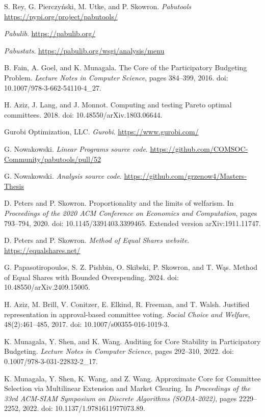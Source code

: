 \documentclass[magisterska,en]{pracamgr}
\begin{document}
\begin{thebibliography}{99}

 S. Rey, G. Pierczyński, M. Utke, and P. Skowron. \textit{Pabutools}
\url{https://pypi.org/project/pabutools/}

 \textit{Pabulib}.
\url{https://pabulib.org/}

 \textit{Pabustats}.
\url{https://pabulib.org/wsgi/analysis/menu}

 B. Fain, A. Goel, and K. Munagala. The Core of the Participatory Budgeting Problem.
\textit{Lecture Notes in Computer Science}, pages 384--399, 2016.
doi: 10.1007/978-3-662-54110-4\_27.

 H. Aziz, J. Lang, and J. Monnot. Computing and testing Pareto optimal committees.
2018.
doi: 10.48550/arXiv.1803.06644.

 Gurobi Optimization, LLC. \textit{Gurobi}.
\url{https://www.gurobi.com/}

 G. Nowakowski. \textit{Linear Programs source code}.
\url{https://github.com/COMSOC-Community/pabutools/pull/52}

 G. Nowakowski. \textit{Analysis source code}.
\url{https://github.com/grzenow4/Masters-Thesis}

 D. Peters and P. Skowron. Proportionality and the limits of welfarism.
In \textit{Proceedings of the 2020 ACM Conference on Economics and Computation}, pages 793--794, 2020.
doi: 10.1145/3391403.3399465. Extended version arXiv:1911.11747.

 D. Peters and P. Skowron. \textit{Method of Equal Shares website}.
\url{https://equalshares.net/}

 G. Papasotiropoulos, S. Z. Pishbin, O. Skibski, P. Skowron, and T. Wąs. Method of Equal Shares with Bounded Overspending.
2024.
doi: 10.48550/arXiv.2409.15005.

 H. Aziz, M. Brill, V. Conitzer, E. Elkind, R. Freeman, and T. Walsh. Justified representation in approval-based committee voting.
\textit{Social Choice and Welfare}, 48(2):461--485, 2017.
doi: 10.1007/s00355-016-1019-3.

 K. Munagala, Y. Shen, and K. Wang. Auditing for Core Stability in Participatory Budgeting.
\textit{Lecture Notes in Computer Science}, pages 292--310, 2022.
doi: 0.1007/978-3-031-22832-2\_17.

 K. Munagala, Y. Shen, K. Wang, and Z. Wang. Approximate Core for Committee Selection via Multilinear Extension and Market Clearing.
In \textit{Proceedings of the 33rd ACM-SIAM Symposium on Discrete Algorithms (SODA-2022)}, pages 2229--2252, 2022.
doi: 10.1137/1.9781611977073.89.


\end{thebibliography}
\end{document}

